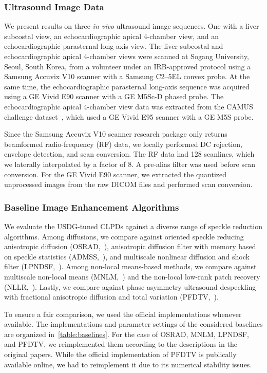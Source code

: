 \subsubsection{Ultrasound Image Data}\label{section:data}
We present results on three \textit{in vivo} ultrasound image sequences.
One with a liver subcostal view, an echocardiographic apical 4-chamber view, and an echocardiographic parasternal long-axis view.
The liver subcostal and echocardiographic apical 4-chamber views were scanned at Sogang University, Seoul, South Korea, from a volunteer under an IRB-approved protocol using a Samsung Accuvix V10 scanner with a Samsung C2--5EL convex probe. At the same time, the echocardiographic parasternal long-axis sequence was acquired using a GE Vivid E90 scanner with a GE M5Sc-D phased probe.
The echocardiographic apical 4-chamber view data was extracted from the CAMUS challenge dataset~\cite{leclerc_deep_2019}, which used a GE Vivid E95 scanner with a GE M5S probe.

Since the Samsung Accuvix V10 scanner research package only returns beamformed radio-frequency (RF) data, we locally performed DC rejection, envelope detection, and scan conversion.
The RF data had 128 scanlines, which we laterally interpolated by a factor of 8.
A pre-alias filter was used before scan conversion.
For the GE Vivid E90 scanner, we extracted the quantized unprocessed images from the raw DICOM files and performed scan conversion.


\subsubsection{Baseline Image Enhancement Algorithms}\label{section:baseline}
We evaluate the USDG-tuned CLPDs against a diverse range of speckle reduction algorithms.
Among diffusions, we compare against oriented speckle reducing anisotropic diffusion (OSRAD,~\cite{krissian_oriented_2007}), anisotropic diffusion filter with memory based on speckle statistics (ADMSS,~\cite{ramos-llorden_anisotropic_2015}), and multiscale nonlinear diffusion and shock filter (LPNDSF,~\cite{zhang_multiscale_2006}).
Among non-local means-based methods, we compare against multiscale non-local means (MNLM,~\cite{breivik_realtime_2017}) and the non-local low-rank patch recovery (NLLR,~\cite{zhu_nonlocal_2017}).
Lastly, we compare against phase asymmetry ultrasound despeckling with fractional anisotropic diffusion and total variation (PFDTV,~\cite{mei_phase_2020}).

To ensure a fair comparison, we used the official implementations whenever available.
The implementations and parameter settings of the considered baselines are organized in~\cref{table:baselines}.
For the case of OSRAD, MNLM, LPNDSF, and PFDTV, we reimplemented them according to the descriptions in the original papers.
While the official implementation of PFDTV is publically available online, we had to reimplement it due to its numerical stability issues.

